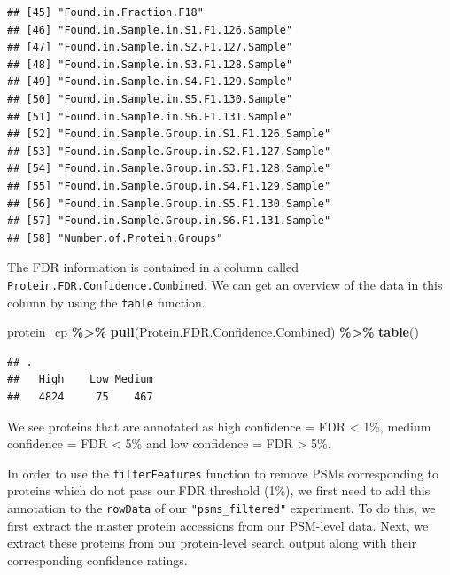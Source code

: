 \documentclass[9pt,a4paper,]{extarticle}
\newenvironment{Shaded}{\begin{snugshade}}{\end{snugshade}}
\newcommand{\FunctionTok}[1]{\textcolor[rgb]{0.13,0.29,0.53}{\textbf{#1}}}
\newcommand{\NormalTok}[1]{#1}
\newcommand{\SpecialCharTok}[1]{\textcolor[rgb]{0.81,0.36,0.00}{\textbf{#1}}}
\begin{document}
\begin{verbatim}
## [45] "Found.in.Fraction.F18"                          
## [46] "Found.in.Sample.in.S1.F1.126.Sample"            
## [47] "Found.in.Sample.in.S2.F1.127.Sample"            
## [48] "Found.in.Sample.in.S3.F1.128.Sample"            
## [49] "Found.in.Sample.in.S4.F1.129.Sample"            
## [50] "Found.in.Sample.in.S5.F1.130.Sample"            
## [51] "Found.in.Sample.in.S6.F1.131.Sample"            
## [52] "Found.in.Sample.Group.in.S1.F1.126.Sample"      
## [53] "Found.in.Sample.Group.in.S2.F1.127.Sample"      
## [54] "Found.in.Sample.Group.in.S3.F1.128.Sample"      
## [55] "Found.in.Sample.Group.in.S4.F1.129.Sample"      
## [56] "Found.in.Sample.Group.in.S5.F1.130.Sample"      
## [57] "Found.in.Sample.Group.in.S6.F1.131.Sample"      
## [58] "Number.of.Protein.Groups"
\end{verbatim}

The FDR information is contained in a column called \texttt{Protein.FDR.Confidence.Combined}.
We can get an overview of the data in this column by using the \texttt{table} function.

\begin{Shaded}
\begin{Highlighting}[]
\NormalTok{protein\_cp }\SpecialCharTok{\%\textgreater{}\%}
  \FunctionTok{pull}\NormalTok{(Protein.FDR.Confidence.Combined) }\SpecialCharTok{\%\textgreater{}\%}
  \FunctionTok{table}\NormalTok{()}
\end{Highlighting}
\end{Shaded}

\begin{verbatim}
## .
##   High    Low Medium 
##   4824     75    467
\end{verbatim}

We see proteins that are annotated as high confidence = FDR \textless{} 1\%, medium
confidence = FDR \textless{} 5\% and low confidence = FDR \textgreater{} 5\%.

In order to use the \texttt{filterFeatures} function to remove PSMs corresponding to
proteins which do not pass our FDR threshold (1\%), we first need to add this
annotation to the \texttt{rowData} of our \texttt{"psms\_filtered"} experiment. To do this, we
first extract the master protein accessions from our PSM-level data. Next, we
extract these proteins from our protein-level search output along with their
corresponding confidence ratings.
\end{document}
